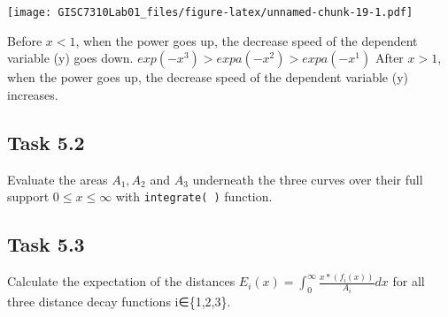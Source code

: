 \documentclass[
]{article}
\newenvironment{Shaded}{\begin{snugshade}}{\end{snugshade}}
\newcommand{\ControlFlowTok}[1]{\textcolor[rgb]{0.13,0.29,0.53}{\textbf{#1}}}
\newcommand{\DataTypeTok}[1]{\textcolor[rgb]{0.13,0.29,0.53}{#1}}
\newcommand{\DecValTok}[1]{\textcolor[rgb]{0.00,0.00,0.81}{#1}}
\newcommand{\KeywordTok}[1]{\textcolor[rgb]{0.13,0.29,0.53}{\textbf{#1}}}
\newcommand{\NormalTok}[1]{#1}
\newcommand{\OperatorTok}[1]{\textcolor[rgb]{0.81,0.36,0.00}{\textbf{#1}}}
\newcommand{\OtherTok}[1]{\textcolor[rgb]{0.56,0.35,0.01}{#1}}
\newcommand{\StringTok}[1]{\textcolor[rgb]{0.31,0.60,0.02}{#1}}
\begin{document}
\texttt{[image: GISC7310Lab01\_files/figure-latex/unnamed-chunk-19-1.pdf]}

Before \(x <1\), when the power goes up, the decrease speed of the
dependent variable (y) goes down. \(exp(-x^3 )>expa(-x^2 )>expa(-x^1 )\)
After \(x>1\), when the power goes up, the decrease speed of the
dependent variable (y) increases.

\hypertarget{task-5.2}{%
\subsection{Task 5.2}\label{task-5.2}}

Evaluate the areas \(A_1, A_2\) and \(A_3\) underneath the three curves
over their full support \(0≤x≤∞\) with \texttt{integrate(\ )} function.

\hypertarget{task-5.3}{%
\subsection{Task 5.3}\label{task-5.3}}

Calculate the expectation of the distances
\(E_i (x) = ∫_0^∞\frac{ x * (f_i (x))}{A_i} dx\) for all three distance
decay functions i∈\{1,2,3\}.

\begin{Shaded}
\end{Shaded}
\end{document}
